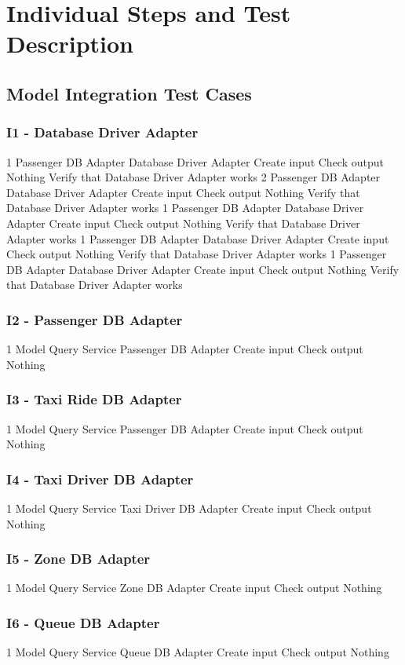 \section{Individual Steps and Test Description}

\subsection{Model Integration Test Cases}
\subsubsection{I1 - Database Driver Adapter}
\testCase
	{1}
	{Passenger DB Adapter}
	{Database Driver Adapter}
	{Create input}
	{Check output}
	{Nothing}
	{Verify that Database Driver Adapter works}
\testCase
	{2}
	{Passenger DB Adapter}
	{Database Driver Adapter}
	{Create input}
	{Check output}
	{Nothing}
	{Verify that Database Driver Adapter works}
\testCase
	{1}
	{Passenger DB Adapter}
	{Database Driver Adapter}
	{Create input}
	{Check output}
	{Nothing}
	{Verify that Database Driver Adapter works}
\testCase
	{1}
	{Passenger DB Adapter}
	{Database Driver Adapter}
	{Create input}
	{Check output}
	{Nothing}
	{Verify that Database Driver Adapter works}
\testCase
	{1}
	{Passenger DB Adapter}
	{Database Driver Adapter}
	{Create input}
	{Check output}
	{Nothing}
	{Verify that Database Driver Adapter works}
\subsubsection{I2 - Passenger DB Adapter}
\testCase
	{1}
	{Model Query Service}
	{Passenger DB Adapter}
	{Create input}
	{Check output}
	{Nothing}
	{}
\subsubsection{I3 - Taxi Ride DB Adapter}
\testCase
	{1}
	{Model Query Service}
	{Passenger DB Adapter}
	{Create input}
	{Check output}
	{Nothing}
	{}
\subsubsection{I4 - Taxi Driver DB Adapter}
\testCase
	{1}
	{Model Query Service}
	{Taxi Driver DB Adapter}
	{Create input}
	{Check output}
	{Nothing}
	{}
\subsubsection{I5 - Zone DB Adapter}
\testCase
	{1}
	{Model Query Service}
	{Zone DB Adapter}
	{Create input}
	{Check output}
	{Nothing}
	{}
\subsubsection{I6 - Queue DB Adapter}
\testCase
	{1}
	{Model Query Service}
	{Queue DB Adapter}
	{Create input}
	{Check output}
	{Nothing}
	{}